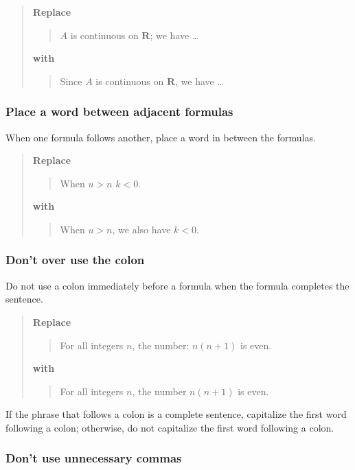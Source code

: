 \documentclass[12pt]{article}
\newcounter{ex}\setcounter{ex}{0}
\newcounter{se}\setcounter{se}{0}
\begin{document}
\begin{quote}
\textbf{\textbf{Replace}}
\begin{quote}
$A$ is continuous on $\mathbf{R}$; we have \dots
\end{quote}
\textbf{with}
\begin{quote}
Since $A$ is continuous on $\mathbf{R}$, we have \dots
\end{quote}
\end{quote}

 \subsubsection{ Place a word between adjacent formulas}

When one formula follows another, place a word in between the formulas.

\begin{quote}
\textbf{\textbf{Replace}}
\begin{quote}
   When \(u > n\)  \(k < 0\).
\end{quote}
\textbf{with}
\begin{quote}
  When \(u > n\), we also have \(k < 0\).
\end{quote}
\end{quote}

 \subsubsection{ Don't over use the colon}

Do not use a colon immediately before a formula when the formula 
completes the sentence.

\begin{quote}
\textbf{\textbf{Replace}}
\begin{quote}
  For all integers \(n\), the number: \(n (n + 1) \) is even.
\end{quote}
\textbf{with}
\begin{quote}
   For all integers \(n\), the number \(n (n + 1) \) is even.
\end{quote}
\end{quote}
If the phrase that follows a colon is a complete sentence, 
capitalize the first word following a colon; otherwise, do
not capitalize the first word following a colon.
 
 \subsubsection{ Don't use unnecessary commas}
\end{document}

